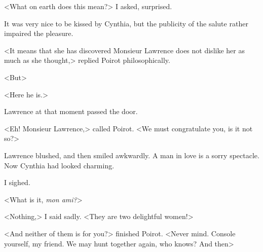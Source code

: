  <What on earth does this mean?> I asked, surprised. 

 It was very nice to be kissed by Cynthia, but the publicity of the salute rather impaired the pleasure. 

 <It means that she has discovered Monsieur Lawrence does not dislike her as much as she thought,> replied Poirot philosophically. 

 <But\longdash> 

 <Here he is.> 

 Lawrence at that moment passed the door. 

 <Eh! Monsieur Lawrence,> called Poirot. <We must congratulate you, is it not so?> 

 Lawrence blushed, and then smiled awkwardly. A man in love is a sorry spectacle. Now Cynthia had looked charming. 

 I sighed. 

 <What is it, \textit{mon ami?}> 

 <Nothing,> I said sadly. <They are two delightful women!> 

 <And neither of them is for you?> finished Poirot. <Never mind. Console yourself, my friend. We may hunt together again, who knows? And then\longdash>